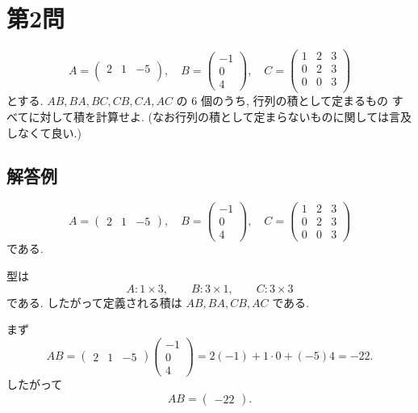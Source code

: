 \documentclass[uplatex,dvipdfmx,a4paper,14pt]{jsarticle}
\begin{document}
\section*{第2問}

\begin{tcolorbox}[problemstyle,title=問題]

\[
A=
\begin{pmatrix}
2 & 1 & -5\\
\end{pmatrix},
\quad
B=
\begin{pmatrix}
-1 \\
0 \\
4
\end{pmatrix},
\quad
C=
\begin{pmatrix}
1 & 2 & 3\\
0 & 2 & 3\\
0 & 0 & 3\\
\end{pmatrix}
\]
とする.
 \(AB, BA, BC, CB, CA, AC\) の \(6\) 個のうち, 行列の積として定まるもの
すべてに対して積を計算せよ. (なお行列の積として定まらないものに関しては言及しなくて良い.)

\end{tcolorbox}

\subsection*{解答例}

\[
A=\begin{pmatrix}2&1&-5\end{pmatrix},\quad
B=\begin{pmatrix}-1\\0\\4\end{pmatrix},\quad
C=\begin{pmatrix}1&2&3\\0&2&3\\0&0&3\end{pmatrix}
\]
である.

型は
\[
A:1\times 3,\qquad B:3\times 1,\qquad C:3\times 3
\]
である. したがって定義される積は $AB,BA,CB,AC$ である.

まず
\[
AB=\begin{pmatrix}2&1&-5\end{pmatrix}
\begin{pmatrix}-1\\0\\4\end{pmatrix}
=2(-1)+1\cdot 0+(-5)4=-22.
\]
したがって
\[
\boxed{AB=\begin{pmatrix}-22\end{pmatrix}.}
\]
\end{document}
